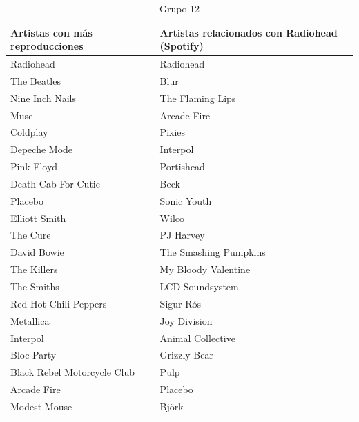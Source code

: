\documentclass[conference]{IEEEtran}
\begin{document}
\begin{table}[]
\centering
\caption{Grupo 12}
\label{tab:relaciones}
\begin{tabular}{|L{3.5cm}|L{3.5cm} |}
\hline
     \textbf{Artistas  con más reproducciones} & \textbf{Artistas relacionados con Radiohead (Spotify)} \\ \hline
               Radiohead   &   Radiohead \\ \hline
           The Beatles     &      Blur        \\ \hline
       Nine Inch Nails     &   The Flaming Lips \\ \hline       
                  Muse     &   Arcade Fire    \\ \hline
              Coldplay     &   Pixies        \\ \hline
          Depeche Mode     &   Interpol       \\ \hline 
            Pink Floyd     &   Portishead      \\ \hline  
   Death Cab For Cutie     &   Beck        \\ \hline
               Placebo     &   Sonic Youth    \\ \hline    
         Elliott Smith     &   Wilco        \\ \hline
              The Cure     &          PJ Harvey        \\ \hline
           David Bowie     &   The Smashing Pumpkins \\ \hline
           The Killers     &   My Bloody Valentine    \\ \hline
            The Smiths     &    LCD Soundsystem        \\ \hline
 Red Hot Chili Peppers     &   Sigur Rós     \\ \hline   
             Metallica     &   Joy Division   \\ \hline     
              Interpol     &   Animal Collective \\ \hline       
            Bloc Party     &   Grizzly Bear   \\ \hline     
 Black Rebel Motorcycle Club &   Pulp       \\ \hline 
           Arcade Fire       &   Placebo      \\ \hline  
 Modest Mouse              &   Björk   \\ \hline 
\end{tabular}
\end{table}
\end{document}
